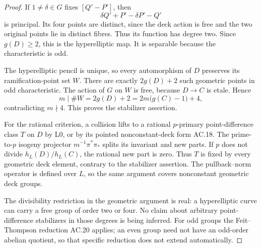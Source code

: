 \begin{proof}
If $1\ne\delta\in G$ fixes $[Q'-P']$, then
\[
           \delta Q'+P'-\delta P'-Q'
\]
is principal. Its four points are distinct, since the
deck action is free and the two original points lie in
distinct fibres. Thus its function has degree two.
Since $g(D)\ge2$, this is the hyperelliptic map. It is
separable because the characteristic is odd.

The hyperelliptic pencil is unique, so every automorphism
of $D$ preserves its ramification-point set $W$.
There are exactly $2g(D)+2$ such geometric points in odd
characteristic. The action of $G$ on $W$ is free, because
$D\to C$ is etale. Hence
\[
 m\mid\#W=2g(D)+2=2m\bigl(g(C)-1\bigr)+4,
\]
contradicting $m\nmid4$. This proves the stabilizer assertion.

For the rational criterion, a collision lifts to a rational
$p$-primary point-difference class $T$ on $D$ by L0,
or by its pointed nonconstant-deck form AC.18. The
prime-to-$p$ isogeny projector
$m^{-1}\pi^*\pi_*$ splits its invariant and new parts.
If $p$ does not divide $h_L(D)/h_L(C)$, the rational new
part is zero. Thus $T$ is fixed by every geometric deck
element, contrary to the stabilizer assertion. The
pullback--norm operator is defined over $L$, so the same
argument covers nonconstant geometric deck groups.

The divisibility restriction in the geometric argument is
real: a hyperelliptic curve can carry a free group of
order two or four. No claim about arbitrary point-difference
stabilizers in those degrees is being inferred. For odd
groups the Feit--Thompson reduction AC.20 applies; an even
group need not have an odd-order abelian quotient, so that
specific reduction does not extend automatically.
\end{proof}

